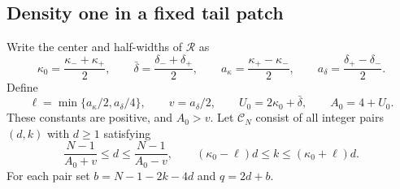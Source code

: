 \documentclass[11pt,a4paper]{article}
\numberwithin{equation}{section}
\begin{document}
\subsection{Density one in a fixed tail patch}\label{aud:sc:density}
Write the center and half-widths of $\mathcal R$ as
\[
 \kappa_0=\frac{\kappa_-+\kappa_+}{2},\qquad
 \bar\delta=\frac{\delta_-+\delta_+}{2},\qquad
 a_\kappa=\frac{\kappa_+-\kappa_-}{2},\qquad
 a_\delta=\frac{\delta_+-\delta_-}{2}.
\]
Define
\begin{equation}\label{aud:sc:patchparameters}
 \ell=\min\{a_\kappa/2,a_\delta/4\},\qquad
 v=a_\delta/2,\qquad
 U_0=2\kappa_0+\bar\delta,\qquad A_0=4+U_0.
\end{equation}
These constants are positive, and $A_0>v$.  Let $\mathcal C_N$ consist of all
integer pairs $(d,k)$ with $d\ge1$ satisfying
\begin{equation}\label{aud:sc:patchcells}
 \frac{N-1}{A_0+v}\le d\le\frac{N-1}{A_0-v},
 \qquad
 (\kappa_0-\ell)d\le k\le(\kappa_0+\ell)d.
\end{equation}
For each pair set $b=N-1-2k-4d$ and $q=2d+b$.
\end{document}

